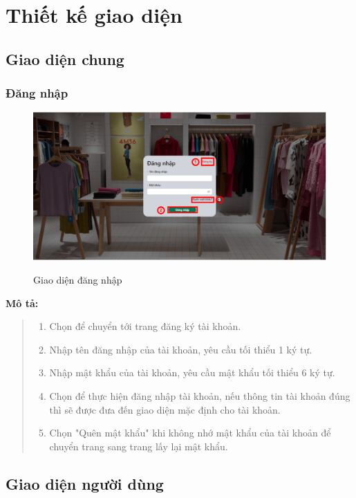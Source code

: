 \section{Thiết kế giao diện}

\subsection{Giao diện chung}
    \subsubsection{Đăng nhập}
    \begin{figure}[!htp]
        \centering
        \includegraphics[width=5in]{img/UI/new_customer/login.png}
        \label{1}
        \newline
        \caption{Giao diện đăng nhập}
    \end{figure}
    \textbf{Mô tả:}
    \begin{quote}
        \begin{enumerate}
            \item Chọn để chuyển tới trang đăng ký tài khoản.
            \item Nhập tên đăng nhập của tài khoản, yêu cầu tối thiểu 1 ký tự.
            \item Nhập mật khẩu của tài khoản, yêu cầu mật khẩu tối thiểu 6 ký tự.
            \item Chọn để thực hiện đăng nhập tài khoản, nếu thông tin tài khoản đúng thì sẽ được đưa đến giao diện mặc định cho tài khoản.
            \item Chọn "Quên mật khẩu" khi không nhớ mật khẩu của tài khoản để chuyển trang sang trang lấy lại mật khẩu.
        \end{enumerate}        
    \end{quote}

\newpage
\subsection{Giao diện người dùng}
